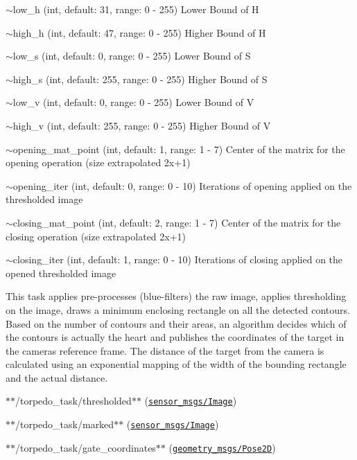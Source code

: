 \begin{DoxyItemize}
\item {\ttfamily $\sim$low\+\_\+h} (int, default\+: 31, range\+: 0 -\/ 255) Lower Bound of H
\item {\ttfamily $\sim$high\+\_\+h} (int, default\+: 47, range\+: 0 -\/ 255) Higher Bound of H
\item {\ttfamily $\sim$low\+\_\+s} (int, default\+: 0, range\+: 0 -\/ 255) Lower Bound of S
\item {\ttfamily $\sim$high\+\_\+s} (int, default\+: 255, range\+: 0 -\/ 255) Higher Bound of S
\item {\ttfamily $\sim$low\+\_\+v} (int, default\+: 0, range\+: 0 -\/ 255) Lower Bound of V
\item {\ttfamily $\sim$high\+\_\+v} (int, default\+: 255, range\+: 0 -\/ 255) Higher Bound of V
\item {\ttfamily $\sim$opening\+\_\+mat\+\_\+point} (int, default\+: 1, range\+: 1 -\/ 7) Center of the matrix for the opening operation (size extrapolated 2x+1)
\item {\ttfamily $\sim$opening\+\_\+iter} (int, default\+: 0, range\+: 0 -\/ 10) Iterations of opening applied on the thresholded image
\item {\ttfamily $\sim$closing\+\_\+mat\+\_\+point} (int, default\+: 2, range\+: 1 -\/ 7) Center of the matrix for the closing operation (size extrapolated 2x+1)
\item {\ttfamily $\sim$closing\+\_\+iter} (int, default\+: 1, range\+: 0 -\/ 10) Iterations of closing applied on the opened thresholded image
\end{DoxyItemize}

This task applies pre-\/processes (blue-\/filters) the raw image, applies thresholding on the image, draws a minimum enclosing rectangle on all the detected contours. Based on the number of contours and their areas, an algorithm decides which of the contours is actually the heart and publishes the coordinates of the target in the camera\textquotesingle{}s reference frame. The distance of the target from the camera is calculated using an exponential mapping of the width of the bounding rectangle and the actual distance.


\begin{DoxyItemize}
\item $\ast$$\ast${\ttfamily /torpedo\+\_\+task/thresholded}$\ast$$\ast$ (\href{http://docs.ros.org/api/sensor_msgs/html/msg/Image.html}{\tt sensor\+\_\+msgs/\+Image})
\item $\ast$$\ast${\ttfamily /torpedo\+\_\+task/marked}$\ast$$\ast$ (\href{http://docs.ros.org/api/sensor_msgs/html/msg/Image.html}{\tt sensor\+\_\+msgs/\+Image})
\item $\ast$$\ast${\ttfamily /torpedo\+\_\+task/gate\+\_\+coordinates}$\ast$$\ast$ (\href{http://docs.ros.org/api/geometry_msgs/html/msg/Pose2D.html}{\tt geometry\+\_\+msgs/\+Pose2D})
\end{DoxyItemize}


